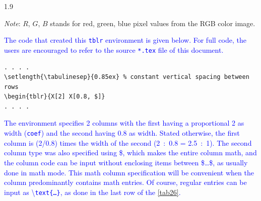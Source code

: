 \documentclass[phd]{ndsu-thesis-2022}
\newcommand\myspacing{1.9} %
\newcommand\italk[1]{\textcolor{blue}{#1}}  %
\newcommand\cmd[1]{\textbackslash\texttt{#1}}  %
\newcommand\vb[1]{\textcolor{blue}{\texttt{#1}}}%
\begin{document}
\begin{spacing}{\myspacing}
\begin{table}[ht]
\begin{tablenotes}[flushleft]
\footnotesize
\item \hspace{-1ex} \emph{Note}: $R$, $G$, $B$ stands for red, green, blue pixel values from the RGB color image.
\label{tab26}
\end{tablenotes}
\end{table}

\italk{The code that created this \vb{tblr} environment is given below. For full code, the users are encouraged to refer to the source \vb{*.tex} file of this document.}

\vspace{-1ex}
{\singlespacing
\begin{verbatim}
. . . . 
\setlength{\tabulinesep}{0.85ex} % constant vertical spacing between rows
\begin{tblr}{X[2] X[0.8, $]}
. . . . 
\end{verbatim}
}

\vspace{-2ex}
\italk{The environment specifies 2 columns with the first having a proportional 2 as width (\vb{coef}) and the second having 0.8 as width. Stated otherwise, the first column is \fpeval{2/0.8} (2/0.8) times the width of the second (2~:~0.8 = 2.5~:~1). The second column type was also specified using \$, which makes the entire column math, and the column code can be input without enclosing items between \$\ldots\$, as usually done in math mode. This math column specification will be convenient when the column predominantly contains math entries. Of course, regular entries can be input as \cmd{text\{\ldots\}}, as done in the last row of the \cref{tab26}.
}


\end{spacing}
\end{document}
